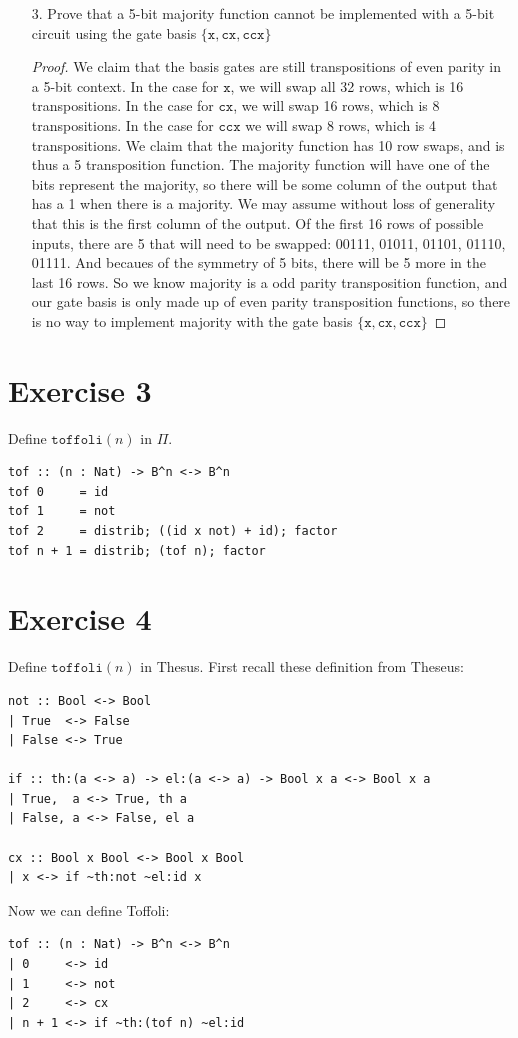 \documentclass[11pt]{article}
\begin{document}
\begin{enumerate}
\item[3.] Prove that a 5-bit majority function cannot be implemented with a 5-bit circuit
	using the gate basis $\{\texttt{x}, \texttt{cx}, \texttt{ccx} \}$
\begin{proof}
	We claim that the basis gates are still transpositions of even parity in a 5-bit context. 
	In the case for $\texttt{x}$, we will swap all 32 rows, which is 16 transpositions. 
	In the case for $\texttt{cx}$, we will swap 16 rows, which is 8 transpositions. 
	In the case for $\texttt{ccx}$ we will swap 8 rows, which is 4 transpositions. 
	We claim that the majority function has 10 row swaps, and is thus a 5 transposition function.
	The majority function will have one of the bits represent the majority, 
		so there will be some column of the output that has a 1 when there is a majority. 
	We may assume without loss of generality that this is the first column of the output. 
	Of the first 16 rows of possible inputs, there are 5 that will need to be swapped: 
	00111, 01011, 01101, 01110, 01111.
	And becaues of the symmetry of  5 bits, there will be 5 more in the last 16 rows.
	So we know majority is a odd parity transposition function, 
	    and our gate basis is only made up of even parity transposition functions, 
	    so there is no way to implement majority with the gate basis 
	    $\{\texttt{x}, \texttt{cx}, \texttt{ccx} \}$
\end{proof}

\end{enumerate}

\newpage

\section{Exercise 3} Define $\texttt{toffoli}(n)$ in $\Pi$.
\begin{lstlisting}
tof :: (n : Nat) -> B^n <-> B^n
tof 0     = id
tof 1     = not
tof 2     = distrib; ((id x not) + id); factor
tof n + 1 = distrib; (tof n); factor
\end{lstlisting}

\section{Exercise 4} Define $\texttt{toffoli}(n)$ in Thesus.
First recall these definition from Theseus:
\begin{lstlisting}
not :: Bool <-> Bool
| True  <-> False
| False <-> True

if :: th:(a <-> a) -> el:(a <-> a) -> Bool x a <-> Bool x a
| True,  a <-> True, th a
| False, a <-> False, el a

cx :: Bool x Bool <-> Bool x Bool
| x <-> if ~th:not ~el:id x
\end{lstlisting}

Now we can define Toffoli:
\begin{lstlisting}
tof :: (n : Nat) -> B^n <-> B^n
| 0     <-> id
| 1     <-> not
| 2     <-> cx
| n + 1 <-> if ~th:(tof n) ~el:id 
\end{lstlisting}
\end{document}
